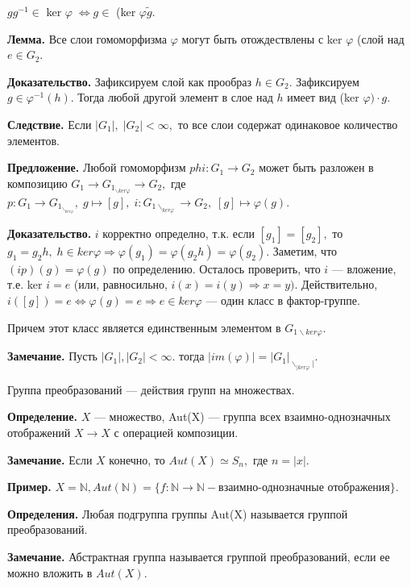 \documentclass[12pt,a4paper]{article}
\begin{document}
$gg^{-1} \in$ ker $\varphi \; \Leftrightarrow g \in$ (ker $\varphi \widetilde{g}.$

\textbf{Лемма.} Все слои гомоморфизма $\varphi$ могут быть отождествлены с ker $\varphi$ (слой над $e \in G_{2}.$ 

\textbf{Доказательство.} Зафиксируем слой как прообраз $h \in G_{2}.$ Зафиксируем $g \in \varphi^{-1}(h).$ Тогда любой другой элемент в слое над $h$ имеет вид (ker $\varphi) \cdot g.$

\textbf{Следствие.} Если $|G_{1}|, \; |G_{2}| < \infty,$ то все слои содержат одинаковое количество элементов. 

\textbf{Предложение.} Любой гомоморфизм $phi: G_{1} \to G_{2}$ может быть разложен в композицию $G_{1} \to G_{1_{\backslash ker \varphi}} \to G_{2},$ где $p: G_{1} \to G_{1_{\backslash_{ker \varphi}}}, \; g \mapsto [g], \; i: G_{1 \backslash_{ker \varphi}} \to G_{2}, \; [g] \mapsto \varphi(g).$ 

\textbf{Доказательство.} $i$ корректно определно, т.к. если $[g_{1}] = [g_{2}],$ то $g_{1} = g_{2}h, \; h \in ker \varphi \Rightarrow \varphi(g_{1}) = \varphi(g_{2}h) = \varphi(g_{2}).$ Заметим, что $(ip)(g) = \varphi(g)$ по определению. Осталось проверить, что $i$ --- вложение, т.е. ker $i = e$ (или, равносильно, $i(x) = i(y) \Rightarrow x = y).$ Действительно, $i([g]) = e \Leftrightarrow \varphi(g) = e \Rightarrow e \in ker \varphi$ --- один класс в фактор-группе. 

Причем этот класс является единственным элементом в $G_{1 \backslash ker \varphi}.$ 

\textbf{Замечание.} Пусть $|G_{1}|, |G_{2}| < \infty.$ тогда $|im(\varphi)| = |G_{1}|_{\backslash_{|ker \varphi}|}.$

Группа преобразований --- действия групп на множествах. 

\textbf{Определение.} $X$ --- множество, Aut(X) --- группа всех взаимно-однозначных отображений $X \to X$ с операцией композиции. 

\textbf{Замечание.} Если $X$ конечно, то $Aut(X) \simeq S_{n},$ где $n = |x|.$ 

\textbf{Пример.} $X = \mathbb{N}, Aut(\mathbb{N}) = \{f: \mathbb{N} \to \mathbb{N} - \text{взаимно-однозначные отображения}\}.$ 

\textbf{Определения.} Любая подгруппа группы Aut(X) называется группой преобразований. 

\textbf{Замечание.} Абстрактная группа называется группой преобразований, если ее можно вложить в $Aut(X).$ 
\end{document}
